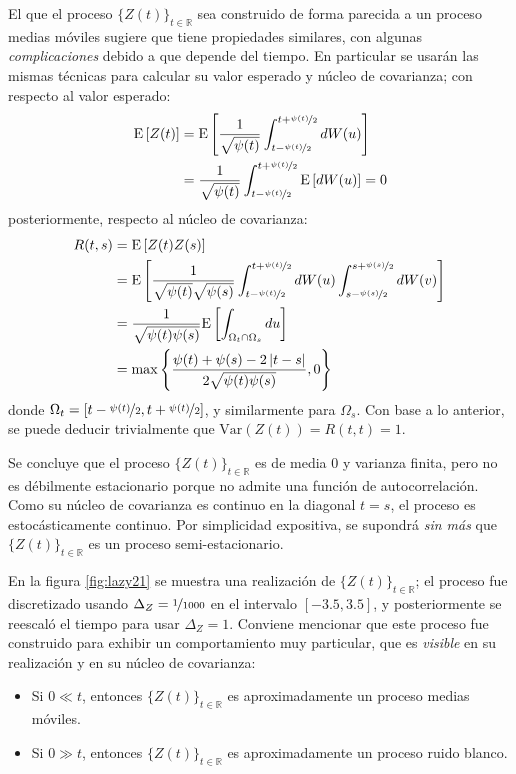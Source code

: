 \documentclass[12pt,letterpaper]{book}
\newcommand{\R}{\mathbb{R}}
\newcommand{\E}[1]{\mathrm{E}\left[ #1 \right]}
\newcommand{\Var}[1]{\mathrm{Var}\left( #1 \right)}
\newcommand{\abso}[1]{\left| #1 \right|}
\begin{document}
El que el proceso $\{Z(t)\}_{t\in\R}$ sea construido de forma parecida a un proceso medias móviles sugiere que tiene propiedades similares, con algunas \textit{complicaciones} debido a que depende del tiempo.
%
En particular se usarán las mismas técnicas para calcular su valor esperado y núcleo de covarianza; con respecto al valor esperado:
\begin{align*}
\E{Z(t)} &= 
\E{\frac{1}{\sqrt{\psi(t)}} \int_{t-\nicefrac{\psi(t)}{2}}^{t+\nicefrac{\psi(t)}{2}} dW(u)} \\
&=
\frac{1}{\sqrt{\psi(t)}} \int_{t-\nicefrac{\psi(t)}{2}}^{t+\nicefrac{\psi(t)}{2}} \E{dW(u)} = 0
\end{align*}
posteriormente, respecto al núcleo de covarianza:
\begin{align*}
R(t,s) &= \E{Z(t)Z(s)} \\
&=
\E{\frac{1}{\sqrt{\psi(t)}\sqrt{\psi(s)}}
\int_{t-\nicefrac{\psi(t)}{2}}^{t+\nicefrac{\psi(t)}{2}} dW(u)
\int_{s-\nicefrac{\psi(s)}{2}}^{s+\nicefrac{\psi(s)}{2}} dW(v)
} \\
&= 
\frac{1}{\sqrt{\psi(t) \psi(s)}}
\E{\int_{\Omega_t \cap \Omega_s} du} \\
&= \max{ \left\{ \frac{\psi(t) + \psi(s) - 2 \abso{t-s}}{2\sqrt{\psi(t)\psi(s)}}, 0 \right\} }
\end{align*}
donde $\Omega_t = \left[ t-\nicefrac{\psi(t)}{2} , t+\nicefrac{\psi(t)}{2} \right]$, y similarmente para $\Omega_s$.
%
Con base a lo anterior, se puede deducir trivialmente que $\Var{Z(t)} = R(t,t) = 1$.

Se concluye que el proceso $\{Z(t)\}_{t\in\R}$ es de media 0 y varianza finita,
pero no es débilmente estacionario porque no admite una función de autocorrelación.
%
Como su núcleo de covarianza es continuo en la diagonal $t=s$, el proceso es estocásticamente continuo.
%
Por simplicidad expositiva, se supondrá \textit{sin más} que $\{Z(t)\}_{t\in\R}$ es un proceso semi-estacionario.

En la figura \ref{fig:lazy21} se muestra una realización de $\{Z(t)\}_{t\in\R}$; el proceso fue discretizado usando $\Delta_Z=\nicefrac{1}{1000}$ en el intervalo $[-3.5,3.5]$, y posteriormente se reescaló el tiempo para usar $\Delta_Z=1$.
%
Conviene mencionar que este proceso fue construido para exhibir un comportamiento muy particular, que es \textit{visible} en su realización y en su núcleo de covarianza: 
\begin{itemize}
\item Si $0 \ll t$, entonces 
$\{Z(t)\}_{t\in\R}$ es aproximadamente un proceso medias móviles.
\item Si $0 \gg t$, entonces  
$\{Z(t)\}_{t\in\R}$ es aproximadamente un proceso ruido blanco.
\end{itemize}
\end{document}
